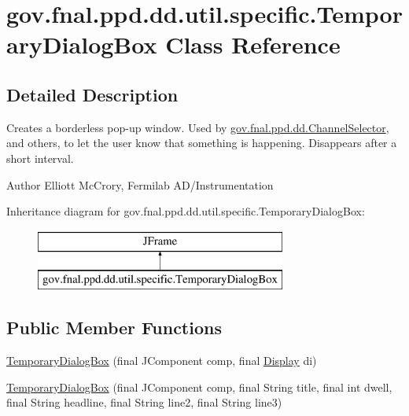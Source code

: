 \hypertarget{classgov_1_1fnal_1_1ppd_1_1dd_1_1util_1_1specific_1_1TemporaryDialogBox}{\section{gov.\-fnal.\-ppd.\-dd.\-util.\-specific.\-Temporary\-Dialog\-Box Class Reference}
\label{classgov_1_1fnal_1_1ppd_1_1dd_1_1util_1_1specific_1_1TemporaryDialogBox}
}


\subsection{Detailed Description}
Creates a borderless pop-\/up window. Used by \hyperlink{classgov_1_1fnal_1_1ppd_1_1dd_1_1ChannelSelector}{gov.\-fnal.\-ppd.\-dd.\-Channel\-Selector}, and others, to let the user know that something is happening. Disappears after a short interval.

\begin{DoxyAuthor}{Author}
Elliott Mc\-Crory, Fermilab A\-D/\-Instrumentation 
\end{DoxyAuthor}
Inheritance diagram for gov.\-fnal.\-ppd.\-dd.\-util.\-specific.\-Temporary\-Dialog\-Box\-:\begin{figure}[H]
\begin{center}
\leavevmode
\includegraphics[height=2.000000cm]{classgov_1_1fnal_1_1ppd_1_1dd_1_1util_1_1specific_1_1TemporaryDialogBox}
\end{center}
\end{figure}
\subsection*{Public Member Functions}
\begin{DoxyCompactItemize}
\item 
\hyperlink{classgov_1_1fnal_1_1ppd_1_1dd_1_1util_1_1specific_1_1TemporaryDialogBox_aa54547c04811d3120a49706ffddb2aea}{Temporary\-Dialog\-Box} (final J\-Component comp, final \hyperlink{interfacegov_1_1fnal_1_1ppd_1_1dd_1_1signage_1_1Display}{Display} di)
\item 
\hyperlink{classgov_1_1fnal_1_1ppd_1_1dd_1_1util_1_1specific_1_1TemporaryDialogBox_ac4a840cc06ba5f87f7ded86949105bd0}{Temporary\-Dialog\-Box} (final J\-Component comp, final String title, final int dwell, final String headline, final String line2, final String line3)
\end{DoxyCompactItemize}
